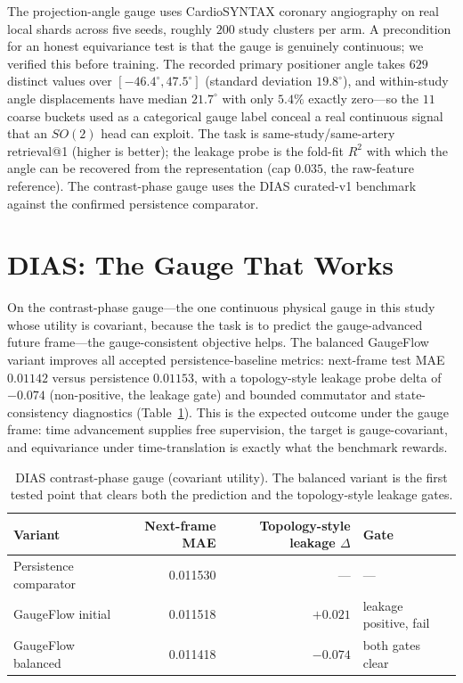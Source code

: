 \documentclass[11pt]{article}
\begin{document}
The projection-angle gauge uses CardioSYNTAX coronary angiography on real local shards across five
seeds, roughly $200$ study clusters per arm. A precondition for an honest equivariance test is that
the gauge is genuinely continuous; we verified this before training. The recorded primary positioner
angle takes $629$ distinct values over $[-46.4^\circ, 47.5^\circ]$ (standard deviation $19.8^\circ$),
and within-study angle displacements have median $21.7^\circ$ with only $5.4\%$ exactly zero---so the
$11$ coarse buckets used as a categorical gauge label conceal a real continuous signal that an
$SO(2)$ head can exploit. The task is same-study/same-artery retrieval@1 (higher is better); the
leakage probe is the fold-fit $R^2$ with which the angle can be recovered from the representation
(cap $0.035$, the raw-feature reference). The contrast-phase gauge uses the DIAS curated-v1
benchmark against the confirmed persistence comparator.

\section{DIAS: The Gauge That Works}\label{sec:dias}

On the contrast-phase gauge---the one continuous physical gauge in this study whose utility is
covariant, because the task is to predict the gauge-advanced future frame---the gauge-consistent
objective helps. The balanced GaugeFlow variant improves all accepted persistence-baseline metrics:
next-frame test MAE $0.01142$ versus persistence $0.01153$, with a topology-style leakage probe delta
of $-0.074$ (non-positive, the leakage gate) and bounded commutator and state-consistency
diagnostics (Table~\ref{tab:dias}). This is the expected outcome under the gauge frame: time
advancement supplies free supervision, the target is gauge-covariant, and equivariance under
time-translation is exactly what the benchmark rewards.

\begin{table}[h]
\centering
\caption{DIAS contrast-phase gauge (covariant utility). The balanced variant is the first tested
point that clears both the prediction and the topology-style leakage gates.}
\label{tab:dias}
\begin{tabular}{lrrl}
\toprule
Variant & Next-frame MAE & Topology-style leakage $\Delta$ & Gate \\
\midrule
Persistence comparator & 0.011530 & --- & --- \\
GaugeFlow initial & 0.011518 & $+0.021$ & leakage positive, fail \\
GaugeFlow balanced & 0.011418 & $-0.074$ & both gates clear \\
\bottomrule
\end{tabular}
\end{table}
\end{document}
